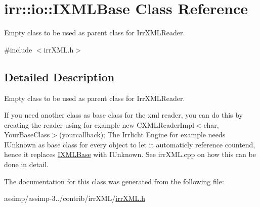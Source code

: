 \hypertarget{classirr_1_1io_1_1_i_x_m_l_base}{\section{irr\+:\+:io\+:\+:I\+X\+M\+L\+Base Class Reference}
\label{classirr_1_1io_1_1_i_x_m_l_base}
}


Empty class to be used as parent class for Irr\+X\+M\+L\+Reader.  




{\ttfamily \#include $<$irr\+X\+M\+L.\+h$>$}



\subsection{Detailed Description}
Empty class to be used as parent class for Irr\+X\+M\+L\+Reader. 

If you need another class as base class for the xml reader, you can do this by creating the reader using for example new C\+X\+M\+L\+Reader\+Impl$<$char, Your\+Base\+Class$>$(yourcallback); The Irrlicht Engine for example needs I\+Unknown as base class for every object to let it automaticly reference countend, hence it replaces \hyperlink{classirr_1_1io_1_1_i_x_m_l_base}{I\+X\+M\+L\+Base} with I\+Unknown. See irr\+X\+M\+L.\+cpp on how this can be done in detail. 

The documentation for this class was generated from the following file\+:\begin{DoxyCompactItemize}
\item 
assimp/assimp-\/3../contrib/irr\+X\+M\+L/\hyperlink{irr_x_m_l_8h}{irr\+X\+M\+L.\+h}\end{DoxyCompactItemize}
